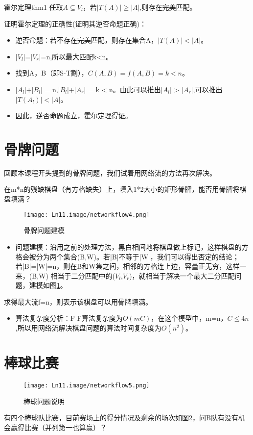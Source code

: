\begin{theorem}{霍尔定理}{thm1}
  任取\(A \subseteq V_l\)，若\(|T(A)| \ge |A|\),则存在完美匹配。
\end{theorem}
证明霍尔定理的正确性(证明其逆否命题正确)：
\begin{itemize}
  \item 逆否命题：若不存在完美匹配，则存在集合A，\(|T(A)| < |A|\)。
  \item |\(V_l\)|=|\(V_r\)|=n,所以最大匹配k<n。
  \item 找到A，B（即S-T割），\(C(A,B) = f(A,B) = k<n\)。
  \item |\(A_l\)|+|\(B_l\)| = n,|\(B_l\)|+|\(A_r\)| = k < n。由此可以推出|\(A_l\)| > |\(A_r\)|,可以推出\(|T(A_l)| < |A|\)。
  \item 因此，逆否命题成立，霍尔定理得证。
\end{itemize}

\section{骨牌问题}
回顾本课程开头提到的骨牌问题，我们试着用网络流的方法再次解决。
\begin{example}
    在m*n的残缺棋盘（有方格缺失）上，填入1*2大小的矩形骨牌，能否用骨牌将棋盘填满？
\end{example}

\begin{figure}[htb]
  \centering
  \texttt{[image: Ln11.image/networkflow4.png]}
  \caption{骨牌问题建模}\label{fig4}
\end{figure}

\begin{itemize}
  \item 问题建模：沿用之前的处理方法，黑白相间地将棋盘做上标记，这样棋盘的方格会被分为两个集合(B,W)。若|B|不等于|W|，我们可以得出否定的结论；若|B|=|W|=n，则在B和W集之间，相邻的方格连上边，容量正无穷，这样一来，(B,W) 相当于二分匹配中的(\(V_l\),\(V_r\))，就相当于解决一个最大二分匹配问题，建模如图\ref{fig4}。
\end{itemize}

求得最大流f=n，则表示该棋盘可以用骨牌填满。
\begin{itemize}
 \item 算法复杂度分析：F-F算法复杂度为\(O(mC)\)，在这个模型中，m=n，\(C \le 4n\),所以用网络流解决棋盘问题的算法时间复杂度为\(O(n^2)\)。
\end{itemize}

\section{棒球比赛}
\begin{figure}[htb]
  \centering
  \texttt{[image: Ln11.image/networkflow5.png]}
  \caption{棒球问题说明}\label{fig5}
\end{figure}
\begin{example}
有四个棒球队比赛，目前赛场上的得分情况及剩余的场次如图\ref{fig5}，问B队有没有机会赢得比赛（并列第一也算赢）？
\end{example}

